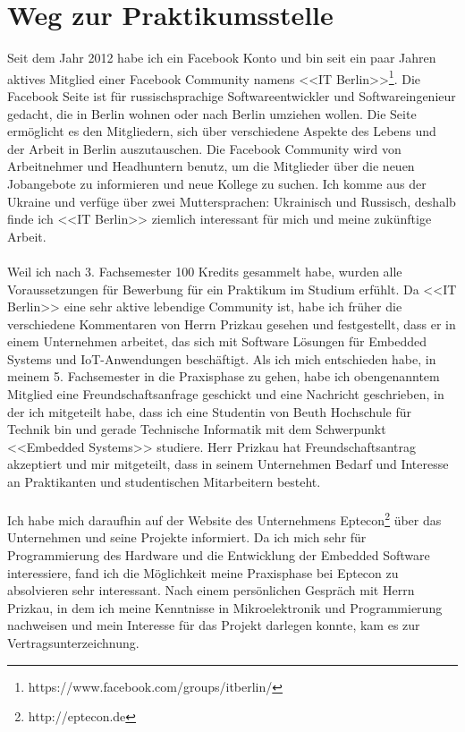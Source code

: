 \section{Weg zur Praktikumsstelle}
\label{sec:intro:wegZurPraktikumsstelle}
Seit dem Jahr 2012 habe ich ein Facebook Konto und bin seit ein paar Jahren aktives Mitglied einer Facebook Community namens <<IT Berlin>>\footnote{https://www.facebook.com/groups/itberlin/}. Die Facebook Seite ist für russischsprachige Softwareentwickler und Softwareingenieur gedacht, die in Berlin wohnen oder nach Berlin umziehen wollen. Die Seite ermöglicht es den Mitgliedern, sich über verschiedene Aspekte des Lebens und der Arbeit in Berlin auszutauschen. Die Facebook Community wird von Arbeitnehmer und Headhuntern benutz, um die Mitglieder über die neuen Jobangebote zu informieren und neue Kollege zu suchen. Ich komme aus der Ukraine und verfüge über zwei Muttersprachen: Ukrainisch und Russisch, deshalb finde ich <<IT Berlin>> ziemlich interessant für mich und meine zukünftige Arbeit. \\\\
Weil ich nach 3. Fachsemester 100 Kredits gesammelt habe, wurden alle Voraussetzungen für Bewerbung für ein Praktikum im Studium erfühlt. Da <<IT Berlin>> eine sehr aktive lebendige Community ist, habe ich früher die verschiedene Kommentaren von Herrn Prizkau gesehen und festgestellt, dass er in einem Unternehmen arbeitet, das sich mit Software Lösungen für Embedded Systems und IoT-Anwendungen beschäftigt. Als ich mich entschieden habe, in meinem 5. Fachsemester in die Praxisphase zu gehen, habe ich obengenanntem Mitglied eine Freundschaftsanfrage geschickt und eine Nachricht geschrieben, in der ich mitgeteilt habe, dass ich eine Studentin von Beuth Hochschule für Technik bin und gerade Technische Informatik mit dem Schwerpunkt <<Embedded Systems>> studiere. Herr Prizkau hat Freundschaftsantrag akzeptiert und mir mitgeteilt, dass in seinem Unternehmen Bedarf und Interesse an Praktikanten und studentischen Mitarbeitern besteht.\\\\
Ich habe mich daraufhin auf der Website des Unternehmens Eptecon\footnote{http://eptecon.de} über das Unternehmen und seine Projekte informiert. Da ich mich sehr für Programmierung des Hardware und die Entwicklung der Embedded Software interessiere, fand ich die Möglichkeit meine Praxisphase bei Eptecon zu absolvieren sehr interessant. Nach einem persönlichen Gespräch mit Herrn Prizkau, in dem ich meine Kenntnisse in Mikroelektronik und Programmierung nachweisen und mein Interesse für das Projekt darlegen konnte, kam es zur Vertragsunterzeichnung.